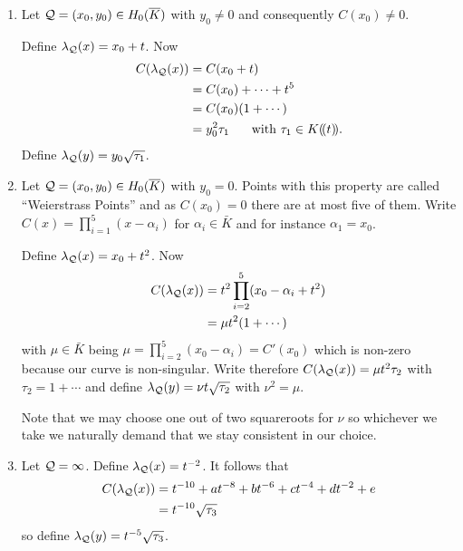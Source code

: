 \documentclass[english,11pt,a4paper]{article}
\begin{document}
\begin{defin}
  \begin{enumerate}[1.]
    \item Let $\mathcal{Q} =(x_0,y_0) \in H_0(\overline K)$ with $y_0 \neq 0$ and consequently $C(x_0)\neq 0$.

    Define $\lambda_{\mathcal{Q}}(x) = x_0 + t$. Now
    \begin{align*}
      C(\lpx) &= C(x_0+t)\\
              &= C(x_0)+ \cdots + t^5\\
              &= C(x_0)(1 + \cdots)\\ %
              &= y_0^2 \tau_1 \text{\hspace{5mm} with } \tau_1 \in K (\! (t)\! ).
    \end{align*}
    Define $\lambda_{\mathcal{Q}}(y) = y_0 \sqrt{\tau_1}$.

    \item Let $\mathcal{Q} =(x_0,y_0) \in H_0(\overline K)$ with $y_0 = 0$. Points with this property are called ``Weierstrass Points'' and as $C(x_0)=0$ there are at most five of them. Write $C(x)=\prod_{i=1}^5 (x-\alpha_i)$ for $\alpha_i \in \bar K$ and for instance $\alpha_1 = x_0$.

    Define $\lambda_{\mathcal{Q}}(x) = x_0 + t^2$. Now
    \begin{align*}
      C(\lambda_{\mathcal{Q}}(x)) &= t^2 \prod_{i=2}^5 (x_0 -\alpha_i + t^2) \\
              &= \mu t^2 (1 + \cdots)
    \end{align*}
    with $\mu \in \bar K$ being $\mu = \prod_{i=2}^5 (x_0 - \alpha_i) = C'(x_0)$ which is non-zero because our curve is non-singular. Write therefore $C(\lambda_{\mathcal{Q}}(x)) = \mu t^2 \tau_2$ with $\tau_2 = 1 + \cdots$ and define $\lambda_{\mathcal{Q}}(y) = \nu t \sqrt{\tau_2}$ with $\nu^2 = \mu$.

    Note that we may choose one out of two squareroots for $\nu$ so whichever we take we naturally demand that we stay consistent in our choice. %

    \item Let $\mathcal{Q} = \infty$. Define $\lambda_{\mathcal{Q}}(x) = t^{-2}$. It follows that
    \begin{align*}
      C(\lambda_{\mathcal{Q}}(x)) &= t^{-10} + at^{-8} + bt^{-6}
                        + ct^{-4}    + dt^{-2} + e\\
                       &= t^{-10} \sqrt{\tau_3}
    \end{align*}
    so define $\lambda_{\mathcal{Q}}(y) = t^{-5} \sqrt{\tau_3}$.
  \end{enumerate}
\end{defin}
\end{document}
